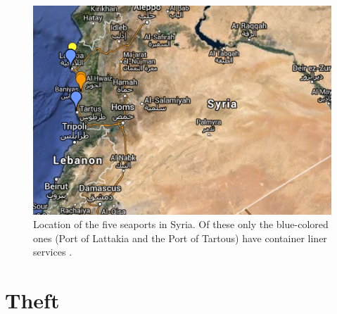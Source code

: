 \documentclass{report}
\begin{document}
\begin{figure}
 \centering
 \includegraphics[trim = 0cm 0cm 0cm 0cm, clip,scale=0.85]{./figures/seaports.png}
   \caption[Location of the five seaports in Syria \cite{WorldPortSource2014}.]{Location of the five seaports in Syria. Of these only the blue-colored ones (Port of Lattakia and the Port of Tartous) have container liner services \cite{WorldPortSource2014}.}
     \label{fig:seaports}
\end{figure}








\section{Theft}
\end{document}
